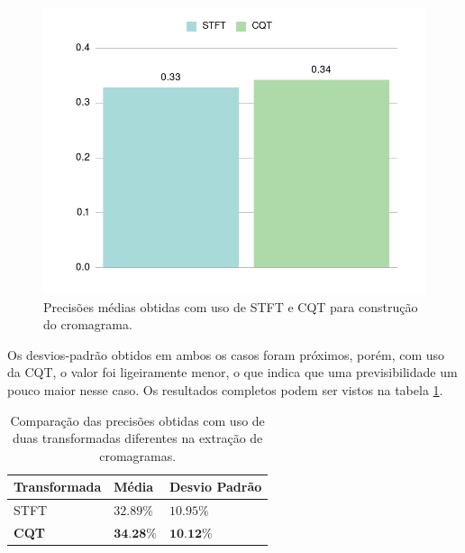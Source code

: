         \begin{figure}[htb]
            \begin{center}
                \includegraphics[width=12cm]{figuras/02-stft-e-cqt-com-templates-binarios.png}
                \caption{\label{fig:exp:chroma}Precisões médias obtidas com uso de STFT e CQT para construção do cromagrama.}
            \end{center}
        \end{figure}
        
        Os desvios-padrão obtidos em ambos os casos foram próximos, porém, com uso da CQT, o valor foi ligeiramente menor, o que indica que uma previsibilidade um pouco maior nesse caso. Os resultados completos podem ser vistos na tabela \ref{tabela:stft-vs-cqt}.
    
        \begin{table}[h]
        \centering
        \begin{tabular}{|l|l|l|}
            \hline
    
            \textbf{Transformada} & \textbf{Média} & \textbf{Desvio Padrão} \\
    
            \hline
    
            STFT  & ${32.89}\%$ & ${10.95}\%$ \\
            \textbf{CQT}   & $\textbf{{34.28}\%}$ & $\textbf{{10.12}\%}$
  \\
    
            \hline
        \end{tabular}
        \caption{Comparação das precisões obtidas com uso de duas transformadas diferentes na extração de cromagramas.}
        \label{tabela:stft-vs-cqt}
        \end{table}
    
